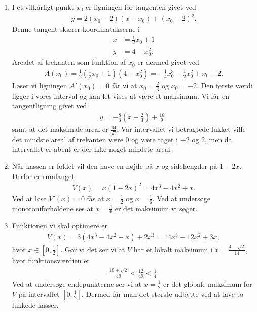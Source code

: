 \begin{enumerate}
	\item I et vilkårligt punkt $x_0$ er ligningen for tangenten givet ved 
	\begin{align*}
	y=2(x_0-2)(x-x_0)+(x_0-2)^2.
	\end{align*}
	Denne tangent skærer koordinatakserne i
	\begin{align*}
	x&=\frac{1}{2}x_0+1\\
	y&=4-x_0^2.
	\end{align*}
	Arealet af trekanten som funktion af $x_0$ er dermed givet ved
	\begin{align*}
	A(x_0)=\frac{1}{2}(\frac{1}{2}x_0+1)(4-x_0^2)=-\frac{1}{4}x_0^3-\frac{1}{2}x_0^2+x_0+2.
	\end{align*}
	Løser vi ligningen $A'(x_0)=0$ får vi at $x_0=\frac{2}{3}$ og $x_0=-2$. Den første værdi ligger i vores interval og kan let vises at være et maksimum. Vi får en tangentligning givet ved
	\begin{align*}
	y=-\frac{8}{3}(x-\frac{2}{3})+\frac{16}{9},
	\end{align*}
	samt at det maksimale areal er $\frac{64}{27}$. Var intervallet vi betragtede lukket ville det mindste areal af trekanten være $0$ og være taget i $-2$ og $2$, men da intervallet er åbent er der ikke noget mindste areal. 
	
	
	\item\label{it:opt1} Når kassen er foldet vil den have en højde på $x$ og sidelængder på $1-2x$. Derfor er rumfanget
	\begin{align*}
	V(x)=x(1-2x)^2=4x^3-4x^2+x.
	\end{align*}
	Ved at løse $V'(x)=0$ fås at $x=\frac{1}{2}$ og $x=\frac{1}{6}$. Ved at undersøge monotoniforholdene ses at $x=\frac{1}{6}$ er det maksimum vi søger.
	
	
	\item Funktionen vi skal optimere er
	\begin{align*}
	V(x)=3(4x^3-4x^2+x)+2x^3=14x^3-12x^2+3x,
	\end{align*}
	hvor $x\in [0,\frac{1}{2}]$. Gør vi det ser vi at $V$ har et lokalt maksimum i $x=\frac{4-\sqrt{2}}{14}$, hvor funktionsværdien er
	\begin{align*}
	\frac{10+\sqrt{2}}{49}<\frac{12}{49}<\frac{1}{4}.
	\end{align*}
	Ved at undersøge endepunkterne ser vi at $x=\frac{1}{2}$ er det globale maksimum for $V$ på intervallet $ [0,\frac{1}{2}] $. Dermed får man det største udbytte ved at lave to lukkede kasser.


\end{enumerate}
